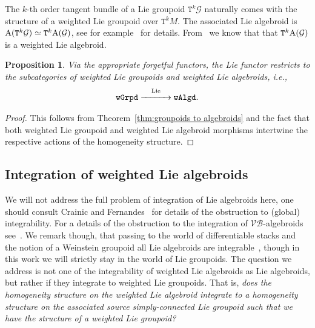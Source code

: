 \documentclass[10pt,a4paper]{amsart}
\newcommand{\Lie}{\textnormal{Lie}}
\newcommand{\catname}[1]{\textnormal{\texttt{#1}}}
\def\sT{{\mathtt T}}
\numberwithin{equation}{section}
\newtheorem{Proposition}[Theorem]{Proposition}
 { \theoremstyle{definition}
\newtheorem{Definition}[Theorem]{Definition}
\newtheorem{Example}[Theorem]{Example}
\newtheorem{Remark}[Theorem]{Remark} }
\begin{document}
\begin{Example}
The $k$-th order tangent bundle of a Lie groupoid $\sT^{k}\mathcal{G}$ naturally comes with the structure of a weighted Lie groupoid over $\sT^{k}M$. The associated Lie algebroid is $\textnormal{A}(\sT^{k}\mathcal{G}) \simeq \sT^{k}\textnormal{A}(\mathcal{G})$, see  for example~\cite{KouotchopWamba:2013} for details. From~\cite{Bruce:2014} we know that that  $\sT^{k}\textnormal{A}(\mathcal{G})$ is a weighted Lie algebroid.
\end{Example}


\begin{Proposition}
Via the appropriate forgetful functors, the Lie functor restricts to the sub\-ca\-te\-gories of weighted Lie groupoids and weighted Lie algebroids, i.e.,
\begin{gather*}
\catname{wGrpd} \stackrel{\Lie}{\xrightarrow{\hspace*{30pt}}} \catname{wAlgd}.
\end{gather*}
\end{Proposition}

\begin{proof}
This follows from Theorem~\ref{thm:groupoids to algebroids} and the fact that both weighted Lie groupoid and weighted Lie algebroid morphisms intertwine the respective actions of the homogeneity structure.
\end{proof}



\subsection{Integration  of weighted Lie algebroids}
 We will not address the full problem of integration of Lie algebroids here, one should consult Crainic and  Fernandes~\cite{Crainic:2003} for details of the obstruction to (global) integrability.  For a details of the obstruction to the integration of $\mathcal{VB}$-algebroids see~\cite{Brahic:2014}. We remark though, that passing to the world of dif\/ferentiable stacks and the notion of a Weinstein groupoid all Lie algebroids are integrable~\cite{Tseng:2006}, though in this work we will strictly stay in the world of Lie groupoids. The question we address is not one of the integrability of weighted Lie algebroids as Lie algebroids, but rather if they integrate to weighted Lie groupoids. That is, \emph{does the homogeneity structure on the weighted Lie algebroid integrate to a homogeneity structure on the associated source simply-connected Lie groupoid such that we have the structure of a weighted Lie groupoid?}
\end{document}
